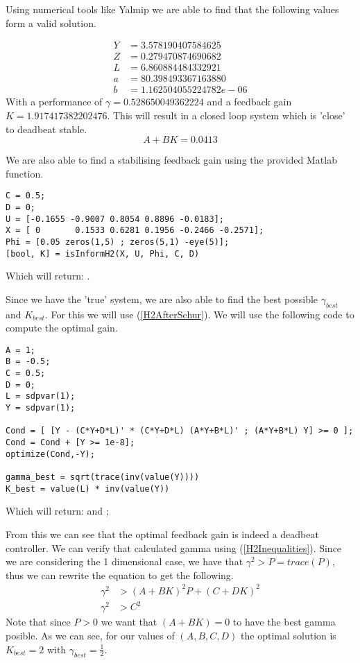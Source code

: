 Using numerical tools like Yalmip we are able to find that the following values form a valid solution.

\begin{align*}
	Y &= 3.578190407584625 \\
	Z &= 0.279470874690682 \\
	L &= 6.860884484332921 \\
	a &= 80.398493367163880 \\
	b &= 1.162504055224782e-06
\end{align*}
With a performance of $\gamma = 0.528650049362224$ and a feedback gain $K = 1.917417382202476$. This will result in a closed loop system which is 'close' to deadbeat stable.
\begin{equation*}
	A + BK = 0.0413
\end{equation*}

We are also able to find a stabilising feedback gain using the provided Matlab function.
\begin{lstlisting}
C = 0.5;
D = 0;
U = [-0.1655 -0.9007 0.8054 0.8896 -0.0183];
X = [ 0       0.1533 0.6281 0.1956 -0.2466 -0.2571];
Phi = [0.05 zeros(1,5) ; zeros(5,1) -eye(5)];
[bool, K] = isInformH2(X, U, Phi, C, D)
\end{lstlisting}
Which will return: \mon{[ 1, 1.917417382202475 ]}.

Since we have the 'true' system, we are also able to find the best possible $\gamma_{best}$ and $K_{best}$. For this we will use (\ref{H2AfterSchur}). We will use the following code to compute the optimal gain.
\begin{lstlisting}
A = 1;
B = -0.5;
C = 0.5;
D = 0;
L = sdpvar(1);
Y = sdpvar(1);

Cond = [ [Y - (C*Y+D*L)' * (C*Y+D*L) (A*Y+B*L)' ; (A*Y+B*L) Y] >= 0 ];
Cond = Cond + [Y >= 1e-8];
optimize(Cond,-Y);

gamma_best = sqrt(trace(inv(value(Y))))
K_best = value(L) * inv(value(Y))
\end{lstlisting}
Which will return:  and ;

From this we can see that the optimal feedback gain is indeed a deadbeat controller. We can verify that calculated gamma using (\ref{H2Inequalities}). Since we are considering the 1 dimensional case, we have that $\gamma^2 > P = trace(P)$, thus we can rewrite the equation to get the following. 
\begin{align*}
	\gamma^2 &> (A + BK)^2 P + (C+DK)^2 \\
	\gamma^2 &>  C^2
\end{align*}
Note that since $P>0$ we want that $(A+BK) = 0$ to have the best gamma posible. As we can see, for our values of $(A,B,C,D)$ the optimal solution is $K_{best} = 2$ with $\gamma_{best} = \frac{1}{2}$.